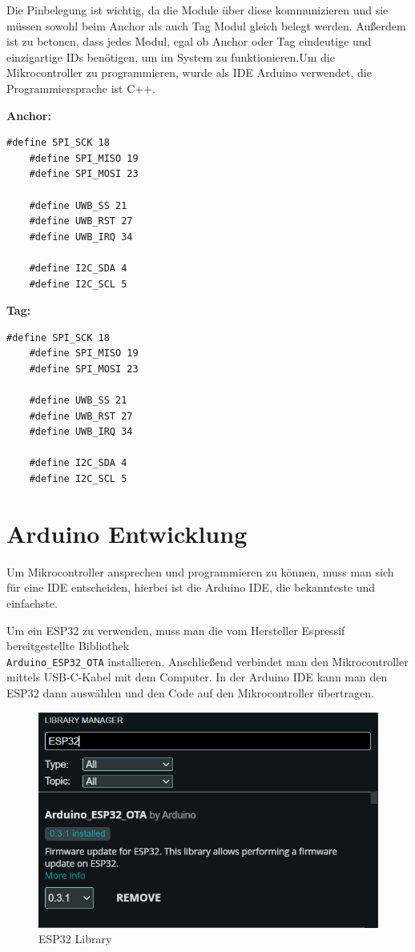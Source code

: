Die Pinbelegung ist wichtig, da die Module über diese kommunizieren und sie müssen sowohl beim Anchor als auch Tag Modul gleich belegt werden. Außerdem ist zu betonen, dass jedes Modul, egal ob Anchor oder Tag eindeutige und einzigartige IDs benötigen, um im System zu funktionieren.Um die Mikrocontroller zu programmieren, wurde als IDE Arduino verwendet, die Programmiersprache ist C++.

\textbf{Anchor:}
\begin{lstlisting}[style=C++, caption=Pinbelegung für Anchor, captionpos=b]
	#define SPI_SCK 18
	#define SPI_MISO 19
	#define SPI_MOSI 23
	
	#define UWB_SS 21
	#define UWB_RST 27
	#define UWB_IRQ 34 
	
	#define I2C_SDA 4
	#define I2C_SCL 5
\end{lstlisting}


\textbf{Tag:}
\begin{lstlisting}[style=C++, caption=Pinbelegung für Tag, captionpos=b]
	#define SPI_SCK 18
	#define SPI_MISO 19
	#define SPI_MOSI 23
	
	#define UWB_SS 21
	#define UWB_RST 27
	#define UWB_IRQ 34 
	
	#define I2C_SDA 4
	#define I2C_SCL 5
\end{lstlisting}

\newpage
\section{Arduino Entwicklung}
Um Mikrocontroller ansprechen und programmieren zu können, muss man sich für eine IDE entscheiden, hierbei ist die Arduino IDE, die bekannteste und einfachste. \parencite{Arduino}

Um ein ESP32 zu verwenden, muss man die vom Hersteller Espressif bereitgestellte Bibliothek \\ \texttt{Arduino\_ESP32\_OTA} installieren. Anschließend verbindet man den Mikrocontroller mittels USB-C-Kabel mit dem Computer. In der Arduino IDE kann man den ESP32 dann auswählen und den Code auf den Mikrocontroller übertragen.

\begin{figure}[H]
	\centering
	\includegraphics[width=0.9\linewidth]{images/ArduinoLib.png}
	\caption[ESP32Library]{ESP32 Library}
	\label{fig:ESP32Lib}
\end{figure}


